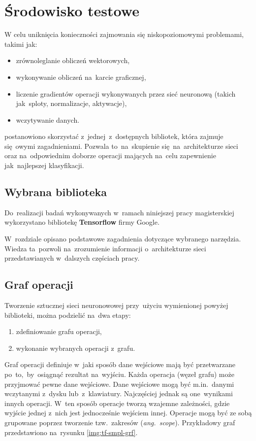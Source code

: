 \chapter{Środowisko testowe}
W celu uniknięcia konieczności zajmowania się niskopoziomowymi problemami, takimi jak:
\begin{itemize}
    \item zrównoleglanie obliczeń wektorowych,
    \item wykonywanie obliczeń na~karcie graficznej,
    \item liczenie gradientów operacji wykonywanych przez sieć neuronową (takich jak~sploty, normalizacje, aktywacje),
    \item wczytywanie danych.
\end{itemize}
postanowiono skorzystać z~jednej~z~dostępnych bibliotek, która zajmuje się~owymi zagadnieniami. Pozwala to~na~skupienie
się~na~architekturze sieci oraz na~odpowiednim doborze operacji mających na~celu zapewnienie jak~najlepszej
klasyfikacji.

\section{Wybrana biblioteka}
Do~realizacji badań wykonywanych w~ramach niniejszej pracy magisterskiej wykorzystano bibliotekę
\textbf{Tensorflow} firmy Google.

W~rozdziale opisano podstawowe zagadnienia dotyczące wybranego narzędzia. Wiedza ta~pozwoli na~zrozumienie
informacji o~architekturze sieci przedstawianych w~dalszych częściach pracy.

\section{Graf operacji}
Tworzenie sztucznej sieci neuronowowej przy~użyciu wymienionej powyżej biblioteki, można podzielić na~dwa etapy:
\begin{enumerate}
    \item zdefiniowanie grafu operacji,
    \item wykonanie wybranych operacji z~grafu.
\end{enumerate}

Graf operacji definiuje w~jaki sposób dane wejściowe mają być przetwarzane po~to,~by~osiągnąć rezultat na~wyjściu.
Każda operacja (węzeł grafu) może przyjmować pewne dane wejściowe. Dane wejściowe mogą być m.in.~danymi wczytanymi
z~dysku lub~z~klawiatury. Najczęściej jednak są one~wynikami innych operacji. W~ten sposób operacje tworzą wzajemne
zależności, gdzie wyjście jednej z~nich jest jednocześnie wejściem innej. Operacje mogą być ze sobą grupowane poprzez
tworzenie tzw.~zakresów (\textit{ang.~scope}). Przykładowy graf przedstawiono na~rysunku \ref{img:tf-smpl-grf}.

